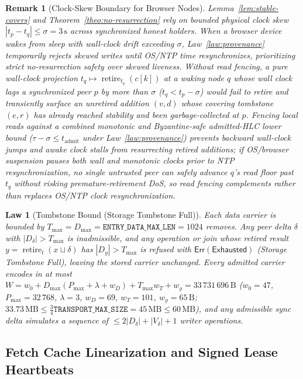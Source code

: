 \documentclass[journal]{IEEEtran}
\newtheorem{law}{Law}
\newtheorem{remark}{Remark}
\DeclareRobustCommand{\code}[1]{{\ttfamily\renewcommand{\_}{\textunderscore\allowbreak}#1}}
\begin{document}
\begin{remark}[Clock-Skew Boundary for Browser Nodes]
Lemma~\ref{lem:stable-covers} and Theorem~\ref{theo:no-resurrection} rely on bounded physical clock skew $|t_p-t_q|\le\sigma=3\,\mathrm{s}$ across synchronized honest holders. When a browser device wakes from sleep with wall-clock drift exceeding $\sigma$, Law~\ref{law:provenance} temporarily rejects skewed writes until OS/NTP time resynchronizes, prioritizing strict no-resurrection safety over skewed liveness. Without read fencing, a pure wall-clock projection $t_q\mapsto\operatorname{retire}_{t_q}(c[k])$ at a waking node $q$ whose wall clock lags a synchronized peer $p$ by more than $\sigma$ ($t_q<t_p-\sigma$) would fail to retire and transiently surface an unretired addition $(v,d)$ whose covering tombstone $(e,r)$ has already reached stability and been garbage-collected at $p$. Fencing local reads against a combined monotonic and Byzantine-safe admitted-HLC lower bound ($\tau-\sigma\le t_{\mathrm{admit}}$ under Law~\ref{law:provenance}) prevents backward wall-clock jumps and awake clock stalls from resurrecting retired additions; if OS/browser suspension pauses both wall and monotonic clocks prior to NTP resynchronization, no single untrusted peer can safely advance $q$'s read floor past $t_q$ without risking premature-retirement DoS, so read fencing complements rather than replaces OS/NTP clock resynchronization.
\end{remark}

\begin{law}[Tombstone Bound (\code{Storage Tombstone Full})]\label{law:tombstone-bound}
Each data carrier is bounded by $T_{\max}=D_{\max}=\mathtt{ENTRY\_DATA\_MAX\_LEN}=1024$
removes.  Any peer delta $\delta$ with $|D_\delta|>T_{\max}$ is inadmissible,
and any operation or join whose retired result $y=\operatorname{retire}_t(x\sqcup\delta)$
has $|D_y|>T_{\max}$ is refused with $\mathsf{Err}(\mathsf{Exhausted})$
(\code{Storage Tombstone Full}), leaving the stored carrier unchanged.  Every
admitted carrier encodes in at most $W=w_0+D_{\max}(P_{\max}+\lambda+w_D)+T_{\max}w_T+w_\varrho=33\,731\,696\,\text{B}$ ($w_0=47$, $P_{\max}=32\,768$, $\lambda=3$, $w_D=69$, $w_T=101$, $w_\varrho=65\,\text{B}$; $33.73\,\text{MB}\le \tfrac{3}{4}\mathtt{TRANSPORT\_MAX\_SIZE} =45\,\text{MB}\le 60\,\text{MB}$), and any admissible sync delta simulates a sequence of $\le 2|D_\delta|+|V_\delta|+1$ writer operations.
\end{law}

\subsection{Fetch Cache Linearization and Signed Lease Heartbeats}
\end{document}
